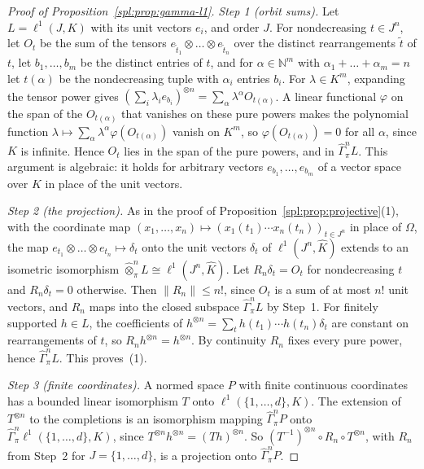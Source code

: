 \documentclass[11pt]{amsart}
\theoremstyle{definition}
\theoremstyle{remark}
\numberwithin{equation}{section}
\newcommand{\N}{\mathbb N}
\newcommand{\norm}[1]{\lVert #1\rVert}
\theoremstyle{plain}
\theoremstyle{definition}
\theoremstyle{plain}
\begin{document}
\begin{proof}[Proof of Proposition~\ref{spl:prop:gamma-l1}]
\emph{Step 1 (orbit sums).} Let $L=\ell^1(J,K)$ with its unit vectors $e_i$, and order $J$. For nondecreasing
$t\in J^n$, let $O_t$ be the sum of the tensors $e_{\tilde t_1}\otimes\dots\otimes e_{\tilde t_n}$ over the distinct
rearrangements $\tilde t$ of $t$, let $b_1,\dots,b_m$ be the distinct entries of $t$, and for $\alpha\in\N^m$ with
$\alpha_1+\dots+\alpha_m=n$ let $t(\alpha)$ be the nondecreasing tuple with $\alpha_i$ entries $b_i$. For $\lambda\in K^m$,
expanding the tensor power gives $(\sum_i\lambda_ie_{b_i})^{\otimes n}=\sum_\alpha\lambda^\alpha O_{t(\alpha)}$. A linear
functional $\varphi$ on the span of the $O_{t(\alpha)}$ that vanishes on these pure powers makes the polynomial function
$\lambda\mapsto\sum_\alpha\lambda^\alpha\varphi(O_{t(\alpha)})$ vanish on $K^m$, so $\varphi(O_{t(\alpha)})=0$ for all
$\alpha$, since $K$ is infinite. Hence $O_t$ lies in the span of the pure powers, and in $\widehat\Gamma^n_\pi L$. This
argument is algebraic: it holds for arbitrary vectors $e_{b_1},\dots,e_{b_m}$ of a vector space over $K$ in place of
the unit vectors.

\emph{Step 2 (the projection).} As in the proof of Proposition~\ref{spl:prop:projective}(1), with the coordinate map
$(x_1,\dots,x_n)\mapsto(x_1(t_1)\cdots x_n(t_n))_{t\in J^n}$ in place of $\Omega$, the map
$e_{t_1}\otimes\dots\otimes e_{t_n}\mapsto\delta_t$ onto the unit vectors $\delta_t$ of $\ell^1(J^n,\widehat K)$ extends
to an isometric isomorphism $\widehat\otimes^n_\pi L\cong\ell^1(J^n,\widehat K)$. Let $R_n\delta_t=O_t$ for
nondecreasing $t$ and $R_n\delta_t=0$ otherwise. Then $\norm{R_n}\le n!$, since $O_t$ is a sum of at most $n!$ unit
vectors, and $R_n$ maps into the closed subspace $\widehat\Gamma^n_\pi L$ by Step~1. For finitely supported $h\in L$, the
coefficients of $h^{\otimes n}=\sum_th(t_1)\cdots h(t_n)\delta_t$ are constant on rearrangements of $t$, so
$R_nh^{\otimes n}=h^{\otimes n}$. By continuity $R_n$ fixes every pure power, hence $\widehat\Gamma^n_\pi L$. This
proves~(1).

\emph{Step 3 (finite coordinates).} A normed space $P$ with finite continuous coordinates has a bounded linear
isomorphism $T$ onto $\ell^1(\{1,\dots,d\},K)$. The extension of $T^{\otimes n}$ to the completions is an isomorphism
mapping $\widehat\Gamma^n_\pi P$ onto $\widehat\Gamma^n_\pi\ell^1(\{1,\dots,d\},K)$, since
$T^{\otimes n}h^{\otimes n}=(Th)^{\otimes n}$. So $(T^{-1})^{\otimes n}\circ R_n\circ T^{\otimes n}$, with $R_n$ from
Step~2 for $J=\{1,\dots,d\}$, is a projection onto $\widehat\Gamma^n_\pi P$.
\end{proof}
\end{document}
